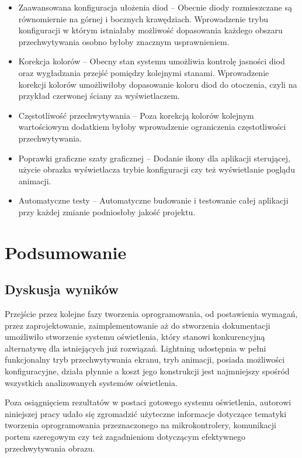 \documentclass[12pt]{report}
\begin{document}
\begin{itemize}
	\item Zaawansowana konfiguracja ułożenia diod -- Obecnie diody rozmieszczane są równomiernie na górnej i bocznych krawędziach. Wprowadzenie trybu konfiguracji w którym istniałaby możliwość dopasowania każdego obszaru przechwytywania osobno byłoby znacznym usprawnieniem.
	\item Korekcja kolorów -- Obecny stan systemu umożliwia kontrolę jasności diod oraz wygładzania przejść pomiędzy kolejnymi stanami. Wprowadzenie korekcji kolorów umożliwiłoby dopasowanie koloru diod do otoczenia, czyli na przykład czerwonej ściany za wyświetlaczem.
	\item Częstotliwość przechwytywania -- Poza korekcją kolorów kolejnym wartościowym dodatkiem byłoby wprowadzenie ograniczenia częstotliwości przechwytywania.
	\item Poprawki graficzne szaty graficznej -- Dodanie ikony dla aplikacji sterującej, użycie obrazka wyświetlacza trybie konfiguracji czy też wyświetlanie poglądu animacji.
	\item Automatyczne testy -- Automatyczne budowanie i testowanie całej aplikacji przy każdej zmianie podniosłoby jakość projektu. 
\end{itemize}

\chapter{Podsumowanie}

\section{Dyskusja wyników}

Przejście przez kolejne fazy tworzenia oprogramowania, od postawienia wymagań, przez zaprojektowanie, zaimplementowanie aż do stworzenia dokumentacji umożliwiło stworzenie systemu oświetlenia, który stanowi konkurencyjną alternatywę dla istniejących już rozwiązań.  Lightning udostępnia w pełni funkcjonalny tryb przechwytywania ekranu, tryb animacji, posiada możliwości konfiguracyjne, działa płynnie a koszt jego konstrukcji jest najmniejszy spośród wszystkich analizowanych systemów oświetlenia.

Poza osiągnięciem rezultatów w postaci gotowego systemu oświetlenia, autorowi niniejszej pracy udało się zgromadzić użyteczne informacje dotyczące tematyki tworzenia oprogramowania przeznaczonego na mikrokontrolery, komunikacji portem szeregowym czy też zagadnieniom dotyczącym efektywnego przechwytywania obrazu.
\end{document}

